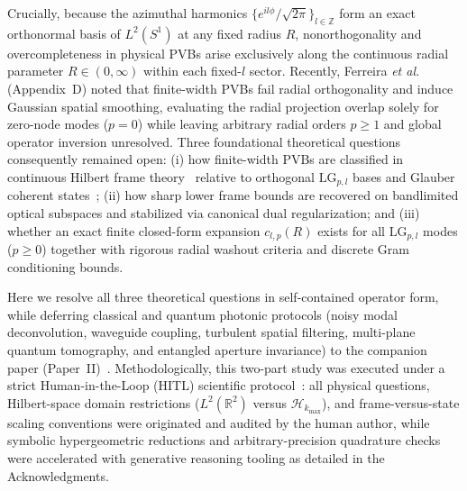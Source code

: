 \documentclass[aps,pra,onecolumn,notitlepage,11pt,tightenlines,nofootinbib,floatfix,longbibliography]{revtex4-2}
\theoremstyle{remark}
\begin{document}
Crucially, because the azimuthal harmonics $\{e^{il\phi}/\sqrt{2\pi}\}_{l\in\mathbb{Z}}$ form an exact orthonormal basis of $L^2(S^1)$ at any fixed radius $R$, nonorthogonality and overcompleteness in physical PVBs arise exclusively along the continuous radial parameter $R \in (0,\infty)$ within each fixed-$l$ sector. Recently, Ferreira \emph{et al.}~\cite{Ferreira2026} (Appendix~D) noted that finite-width PVBs fail radial orthogonality and induce Gaussian spatial smoothing, evaluating the radial projection overlap solely for zero-node modes ($p = 0$) while leaving arbitrary radial orders $p \ge 1$ and global operator inversion unresolved. Three foundational theoretical questions consequently remained open: (i) how finite-width PVBs are classified in continuous Hilbert frame theory~\cite{Duffin1952,Daubechies1990,Ali1993,Christensen2016} relative to orthogonal $\mathrm{LG}_{p,l}$ bases and Glauber coherent states~\cite{Klauder1985,Perelomov1986,Gazeau2009}; (ii) how sharp lower frame bounds are recovered on bandlimited optical subspaces and stabilized via canonical dual regularization; and (iii) whether an exact finite closed-form expansion $c_{l,p}(R)$ exists for all $\mathrm{LG}_{p,l}$ modes ($p \ge 0$) together with rigorous radial washout criteria and discrete Gram conditioning bounds.

Here we resolve all three theoretical questions in self-contained operator form, while deferring classical and quantum photonic protocols (noisy modal deconvolution, waveguide coupling, turbulent spatial filtering, multi-plane quantum tomography, and entangled aperture invariance) to the companion paper (Paper~II)~\cite{AyalaPaperII}. Methodologically, this two-part study was executed under a strict Human-in-the-Loop (HITL) scientific protocol~\cite{Krenn2022,Birhane2023,Messeri2024,Chandra2026TheoPhysEval,Thorp2023Science,COPE2023AI}: all physical questions, Hilbert-space domain restrictions ($L^2(\mathbb{R}^2)$ versus $\mathcal{H}_{k_{\max}}$), and frame-versus-state scaling conventions were originated and audited by the human author, while symbolic hypergeometric reductions and arbitrary-precision quadrature checks were accelerated with generative reasoning tooling as detailed in the Acknowledgments.
\end{document}
